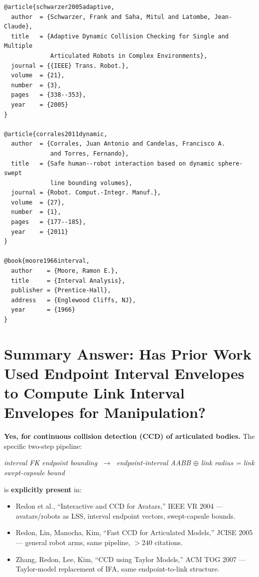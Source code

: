 \documentclass[11pt,a4paper]{article}
\begin{document}
\begin{verbatim}
@article{schwarzer2005adaptive,
  author  = {Schwarzer, Frank and Saha, Mitul and Latombe, Jean-Claude},
  title   = {Adaptive Dynamic Collision Checking for Single and Multiple
             Articulated Robots in Complex Environments},
  journal = {{IEEE} Trans. Robot.},
  volume  = {21},
  number  = {3},
  pages   = {338--353},
  year    = {2005}
}

@article{corrales2011dynamic,
  author  = {Corrales, Juan Antonio and Candelas, Francisco A.
             and Torres, Fernando},
  title   = {Safe human--robot interaction based on dynamic sphere-swept
             line bounding volumes},
  journal = {Robot. Comput.-Integr. Manuf.},
  volume  = {27},
  number  = {1},
  pages   = {177--185},
  year    = {2011}
}

@book{moore1966interval,
  author    = {Moore, Ramon E.},
  title     = {Interval Analysis},
  publisher = {Prentice-Hall},
  address   = {Englewood Cliffs, NJ},
  year      = {1966}
}
\end{verbatim}

\section{Summary Answer: Has Prior Work Used Endpoint Interval Envelopes\\
  to Compute Link Interval Envelopes for Manipulation?}
\label{sec:summary_answer}

\textbf{Yes, for continuous collision detection (CCD) of articulated bodies.}
The specific two-step pipeline:
\begin{center}
  \emph{interval FK endpoint bounding}
  $\;\longrightarrow\;$
  \emph{endpoint-interval AABB $\oplus$ link radius = link swept-capsule bound}
\end{center}
is \textbf{explicitly present} in:
\begin{itemize}[nosep]
  \item Redon et al., ``Interactive and CCD for Avatars,'' IEEE VR 2004
        \cite{redon2004continuous_avatar} --- avatars/robots as LSS, interval
        endpoint vectors, swept-capsule bounds.
  \item Redon, Lin, Manocha, Kim, ``Fast CCD for Articulated Models,'' JCISE 2005
        \cite{redon2005fast} --- general robot arms, same pipeline, $>240$ citations.
  \item Zhang, Redon, Lee, Kim, ``CCD using Taylor Models,'' ACM TOG 2007
        \cite{zhang2007taylor} --- Taylor-model replacement of IFA, same endpoint-to-link structure.
\end{itemize}
\end{document}
